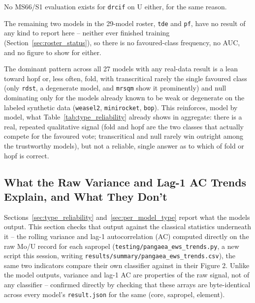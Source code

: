 No MS66/S1 evaluation exists for \texttt{drcif} on U either, for the same reason.

The remaining two models in the 29-model roster, \texttt{tde} and \texttt{pf}, have no result of any kind to report here -- neither ever finished training (Section~\ref{sec:roster_status}), so there is no favoured-class frequency, no AUC, and no figure to show for either.

The dominant pattern across all 27 models with any real-data result is a lean toward hopf or, less often, fold, with transcritical rarely the single favoured class (only \texttt{rdst}, a degenerate model, and \texttt{mrsqm} show it prominently) and null dominating only for the models already known to be weak or degenerate on the labeled synthetic data (\texttt{weasel2}, \texttt{minirocket}, \texttt{bop}). This reinforces, model by model, what Table~\ref{tab:type_reliability} already shows in aggregate: there is a real, repeated qualitative signal (fold and hopf are the two classes that actually compete for the favoured vote; transcritical and null rarely win outright among the trustworthy models), but not a reliable, single answer as to which of fold or hopf is correct.

\subsection{What the Raw Variance and Lag-1 AC Trends Explain, and What They Don't}
\label{sec:ews_trends}

Sections~\ref{sec:type_reliability} and~\ref{sec:per_model_type} report what the models output. This section checks that output against the classical statistics underneath it -- the rolling variance and lag-1 autocorrelation (AC) computed directly on the raw Mo/U record for each sapropel (\texttt{testing/pangaea\_ews\_trends.py}, a new script this session, writing \texttt{results/summary/pangaea\_ews\_trends.csv}), the same two indicators \citet{bury2021} compare their own classifier against in their Figure 2. Unlike the model outputs, variance and lag-1 AC are properties of the raw signal, not of any classifier -- confirmed directly by checking that these arrays are byte-identical across every model's \texttt{result.json} for the same (core, sapropel, element).

